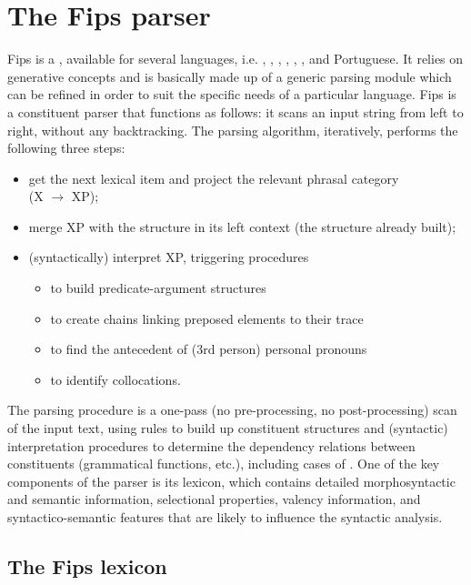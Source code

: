 \documentclass[output=paper]{langsci/langscibook}
\begin{document}
\section{The Fips parser}
\label{fou:sec3}
Fips is a , available for several languages, i.e. , , , , , ,  and Portuguese. It relies on generative  concepts and is basically made up of a generic parsing module which can be refined in order to suit the specific needs of a particular language. Fips is a constituent parser that functions as follows: it scans an input string from left to right, without any backtracking. The parsing algorithm, iteratively, performs the following three steps:
\begin{itemize}
\item get the next lexical item and project the relevant phrasal category\\ (X $\rightarrow$ XP);
\item merge XP with the structure in its left context (the structure already built);
\item (syntactically) interpret XP, triggering procedures 
	\begin{itemize}
		\item to build predicate-argument structures
		\item to create  chains linking preposed elements to their trace
		\item to find the antecedent of (3rd person) personal pronouns
		\item to identify collocations. 
	\end{itemize}
\end{itemize}
 
\vspace*{3mm}
The parsing procedure is a one-pass (no pre-processing, no post-processing) scan of the input text, using rules to build up constituent structures and (syntactic) interpretation procedures to determine the dependency relations between constituents (grammatical functions, etc.), including cases of .
One of the key components of the parser is its lexicon, which contains detailed morphosyntactic and semantic information, selectional properties, valency information, and syntactico-semantic features that are likely to influence the syntactic analysis. 

\subsection{The Fips lexicon}
\end{document}
